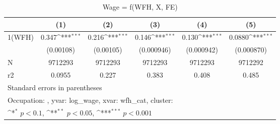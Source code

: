 \begin{table}[htbp]\centering
\def\sym#1{\ifmmode^{#1}\else\(^{#1}\)\fi}
\caption{Wage = f(WFH, X, FE)}
\begin{tabular}{l*{5}{c}}
\hline\hline
                    &\multicolumn{1}{c}{(1)}         &\multicolumn{1}{c}{(2)}         &\multicolumn{1}{c}{(3)}         &\multicolumn{1}{c}{(4)}         &\multicolumn{1}{c}{(5)}         \\
\hline
1(WFH)              &       0.347\sym{***}&       0.216\sym{***}&       0.146\sym{***}&       0.130\sym{***}&      0.0880\sym{***}\\
                    &   (0.00108)         &   (0.00105)         &  (0.000946)         &  (0.000942)         &  (0.000870)         \\
\hline
N                   &     9712293         &     9712293         &     9712293         &     9712293         &     9712292         \\
r2                  &      0.0955         &       0.227         &       0.383         &       0.408         &       0.485         \\
\hline\hline
\multicolumn{6}{l}{\footnotesize Standard errors in parentheses}\\
\multicolumn{6}{l}{\footnotesize Occupation: , yvar: log\_wage, xvar: wfh\_cat, cluster: }\\
\multicolumn{6}{l}{\footnotesize \sym{*} \(p<0.1\), \sym{**} \(p<0.05\), \sym{***} \(p<0.001\)}\\
\end{tabular}
\end{table}
